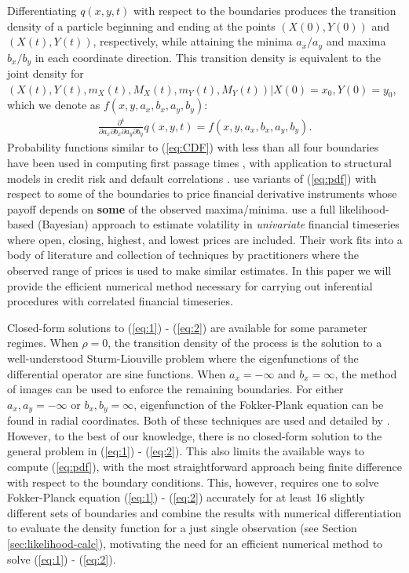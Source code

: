 \documentclass[10pt]{article}
\begin{document}
Differentiating $q(x,y,t)$ with respect to the boundaries produces the
transition density of a particle beginning and ending at the points
$(X(0), Y(0))$ and $(X(t), Y(t))$, respectively, while
attaining the minima $a_x/a_y$ and maxima $b_x/b_y$ in each coordinate
direction. This transition density is equivalent to the joint density
for $(X(t), Y(t), m_X(t), M_X(t), m_Y(t), M_Y(t))| X(0)=x_0, Y(0)=y_0$,
which we denote as $f(x,y,a_x,b_x,a_y,b_y)$:
\begin{align}
  \frac{\partial^4}{\partial a_x \partial b_x \partial a_y \partial b_y} q(x,y,t) = f(x,y,a_x,b_x,a_y,b_y).
  \label{eq:pdf}
\end{align}
Probability functions similar to (\ref{eq:CDF}) with less than all
four boundaries have been used in computing first passage times
\citep{kou2016first, sacerdote2016first}, with application to
structural models in credit risk and default correlations
\citep{haworth2008modelling, ching2014correlated}. \cite{he1998double}
use variants of (\ref{eq:pdf}) with respect to some of the boundaries
to price financial derivative instruments whose payoff depends on
\textbf{some} of the observed maxima/minima. \cite{rodriguez2012} use
a full likelihood-based (Bayesian) approach to estimate volatility in
\textit{univariate} financial timeseries where open, closing, highest,
and lowest prices are included. Their work fits into a body of
literature and collection of techniques by practitioners where the
observed range of prices is used to make similar estimates. In this
paper we will provide the efficient numerical method necessary for
carrying out inferential procedures with correlated financial
timeseries.

Closed-form solutions to (\ref{eq:1}) - (\ref{eq:2}) are available for
some parameter regimes. When $\rho = 0$, the transition density of the
process is the solution to a well-understood Sturm-Liouville problem
where the eigenfunctions of the differential operator are sine
functions. When $a_x = -\infty$ and $b_x = \infty$, the method of
images can be used to enforce the remaining boundaries. For either
$a_x, a_y = -\infty$ or $b_x, b_y = \infty$, eigenfunction of the
Fokker-Plank equation can be found in radial coordinates. Both of
these techniques are used and detailed by
\cite{he1998double}. However, to the best of our knowledge, there is
no closed-form solution to the general problem in (\ref{eq:1}) -
(\ref{eq:2}). This also limits the available ways to compute
(\ref{eq:pdf}), with the most straightforward approach being finite
difference with respect to the boundary conditions. This, however,
requires one to solve Fokker-Planck equation (\ref{eq:1}) - (\ref{eq:2})
accurately for at least 16 slightly different sets of boundaries and
combine the results with numerical differentiation to evaluate the
density function for a just single observation (see Section
\ref{sec:likelihood-calc}), motivating the need for an efficient
numerical method to solve (\ref{eq:1}) - (\ref{eq:2}).
\end{document}
